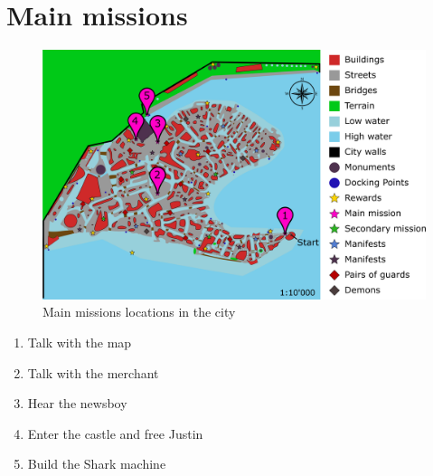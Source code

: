 \section{Main missions}

\begin{figure}[H]
  \centering
  \includegraphics[width=\textwidth]{Images/Maps/dynamiaMainMissions}
  \caption{Main missions locations in the city}
\end{figure}

\begin{enumerate}
	\item Talk with the map
	\item Talk with the merchant
	\item Hear the newsboy
	\item Enter the castle and free Justin
	\item Build the Shark machine
\end{enumerate}
